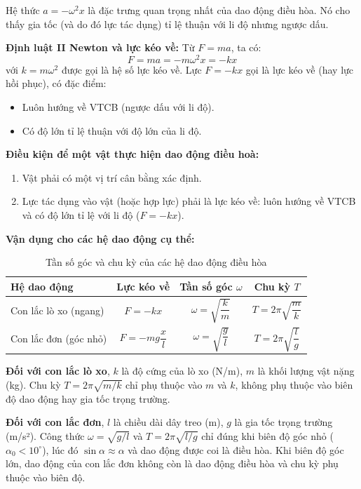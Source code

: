 \begin{enumerate}[label=\alph*)]
    Hệ thức $a = -\omega^2 x$ là đặc trưng quan trọng nhất của dao động điều hòa. Nó cho thấy gia tốc (và do đó lực tác dụng) tỉ lệ thuận với li độ nhưng ngược dấu.

    \textbf{Định luật II Newton và lực kéo về:} Từ $F = ma$, ta có:
    \[
        F = ma = -m\omega^2 x = -kx
    \]
    với $k = m\omega^2$ được gọi là hệ số lực kéo về. Lực $F = -kx$ gọi là lực kéo về (hay lực hồi phục), có đặc điểm:
    \begin{itemize}
        \item Luôn hướng về VTCB (ngược dấu với li độ).
        \item Có độ lớn tỉ lệ thuận với độ lớn của li độ.
    \end{itemize}

    \textbf{Điều kiện để một vật thực hiện dao động điều hoà:}
    \begin{enumerate}
        \item Vật phải có một vị trí cân bằng xác định.
        \item Lực tác dụng vào vật (hoặc hợp lực) phải là lực kéo về: luôn hướng về VTCB và có độ lớn tỉ lệ với li độ ($F = -kx$).
    \end{enumerate}

    \textbf{Vận dụng cho các hệ dao động cụ thể:}

    \begin{table}[H]
    \centering
    \caption{Tần số góc và chu kỳ của các hệ dao động điều hòa}
    \begin{tabular}{|l|c|c|c|}
        \hline
        \textbf{Hệ dao động} & \textbf{Lực kéo về} & \textbf{Tần số góc $\omega$} & \textbf{Chu kỳ $T$} \\ 
        \hline
        Con lắc lò xo (ngang) & $F = -kx$ & $\omega = \sqrt{\dfrac{k}{m}}$ & $T = 2\pi\sqrt{\dfrac{m}{k}}$ \\
        \hline
        Con lắc đơn (góc nhỏ) & $F = -mg\dfrac{x}{l}$ & $\omega = \sqrt{\dfrac{g}{l}}$ & $T = 2\pi\sqrt{\dfrac{l}{g}}$ \\
        \hline
    \end{tabular}
    \end{table}

    \textbf{Đối với con lắc lò xo}, $k$ là độ cứng của lò xo (N/m), $m$ là khối lượng vật nặng (kg). Chu kỳ $T = 2\pi\sqrt{m/k}$ chỉ phụ thuộc vào $m$ và $k$, không phụ thuộc vào biên độ dao động hay gia tốc trọng trường.

    \textbf{Đối với con lắc đơn}, $l$ là chiều dài dây treo (m), $g$ là gia tốc trọng trường (m/s²). Công thức $\omega = \sqrt{g/l}$ và $T = 2\pi\sqrt{l/g}$ chỉ đúng khi biên độ góc nhỏ ($\alpha_0 < 10^\circ$), lúc đó $\sin\alpha \approx \alpha$ và dao động được coi là điều hòa. Khi biên độ góc lớn, dao động của con lắc đơn không còn là dao động điều hòa và chu kỳ phụ thuộc vào biên độ.
\end{enumerate}

